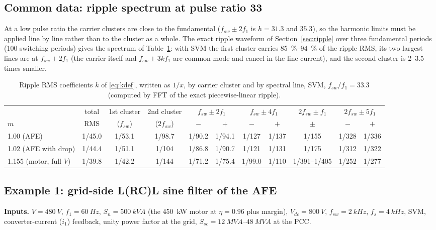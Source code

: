 \documentclass[10pt,a4paper]{scrartcl}
\newcommand{\Vdc}{V_{dc}}
\newcommand{\fsw}{f_{sw}}
\begin{document}
\begin{onehalfspace}
\subsection{Common data: ripple spectrum at pulse ratio 33}
\label{sec:common}
At a low pulse ratio the carrier clusters are close to the fundamental ($\fsw \pm 2f_1$ is $h = 31.3$ and $35.3$), so the harmonic limits must be applied line by line rather than to the cluster as a whole. The exact ripple waveform of Section~\ref{sec:ripple} over three fundamental periods (100 switching periods) gives the spectrum of Table~\ref{tab:cluster}: with SVM the first cluster carries \SIrange{85}{94}{\percent} of the ripple RMS, its two largest lines are at $\fsw \pm 2f_1$ (the carrier itself and $\fsw \pm 3kf_1$ are common mode and cancel in the line current), and the second cluster is \numrange{2}{3.5} times smaller.

\begin{table}[htb]
\centering\scriptsize\begin{onehalfspace}
\caption{Ripple RMS coefficients $k$ of \eqref{eq:kdef}, written as $1/x$, by carrier cluster and by spectral line, SVM, $\fsw/f_1 = 33.3$ (computed by FFT of the exact piecewise-linear ripple).}
\label{tab:cluster}
\begin{tabular}{@{}l ccc cc cc c cc@{}}
\toprule
 & total & 1st cluster & 2nd cluster & \multicolumn{2}{c}{$\fsw \pm 2f_1$} & \multicolumn{2}{c}{$\fsw \pm 4f_1$} & $2\fsw \pm f_1$ & \multicolumn{2}{c}{$2\fsw \pm 5f_1$} \\
\cmidrule(lr){5-6}\cmidrule(lr){7-8}\cmidrule(lr){10-11}
$m$ & RMS & ($\fsw$) & ($2\fsw$) & $-$ & $+$ & $-$ & $+$ & $\pm$ & $-$ & $+$ \\
\midrule
1.00 (AFE)   & 1/45.0 & 1/53.1 & 1/98.7  & 1/90.2 & 1/94.1 & 1/127 & 1/137 & 1/155 & 1/328 & 1/336 \\
1.02 (AFE with drop) & 1/44.4 & 1/51.1 & 1/104 & 1/86.8 & 1/90.7 & 1/121 & 1/131 & 1/175 & 1/312 & 1/322 \\
1.155 (motor, full $V$) & 1/39.8 & 1/42.2 & 1/144 & 1/71.2 & 1/75.4 & 1/99.0 & 1/110 & 1/391--1/405 & 1/252 & 1/277 \\
\bottomrule
\end{tabular}
\end{onehalfspace}
\end{table}

\subsection{Example 1: grid-side L(RC)L sine filter of the AFE}
\label{sec:ex1}
\textbf{Inputs.} $V = \SI{480}{V}$, $f_1 = \SI{60}{Hz}$, $S_n = \SI{500}{kVA}$ (the \SI{450}{kW} motor at $\eta = 0.96$ plus margin), $\Vdc = \SI{800}{V}$, $\fsw = \SI{2}{kHz}$, $f_s = \SI{4}{kHz}$, SVM, converter-current ($i_1$) feedback, unity power factor at the grid, $S_{sc} = \SIrange{12}{48}{MVA}$ at the PCC.


\end{onehalfspace}
\end{document}

